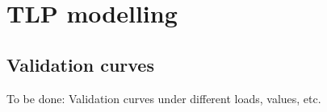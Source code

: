 \chapter{TLP modelling}
\section{Validation curves}
\label{apx:tlp-validation-curves}


To be done: Validation curves under different loads, values, etc.
